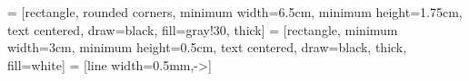 \pagestyle{fancy}
\fancyhf{}
\fancyhead[LE,RO]{\scshape\thepage}
\fancyhead[RE,LO]{
\scshape\ifnum\value{chapter}>0 \fi\leftmark}
\renewcommand{\headrulewidth}{.5pt}
\setlength{\headheight}{15pt}



\hypersetup{pdfdisplaydoctitle = true, colorlinks = false}
\captionsetup{width=.75\textwidth}

\graphicspath{ {./Graphics/} }


\setlength\parindent{0pt}
\allowdisplaybreaks



\setmainfont{MinionPro}

\def\thickhrulefill{\leavevmode \leaders \hrule height 1ex \hfill \kern \z@}
\def\@makechapterhead#1{%
  {\parindent \z@ \centering \reset@font
        \thickhrulefill\quad
        \scshape {\Large{\@chapapp{} \thechapter}}
        \quad \thickhrulefill
        \par\nobreak
        \vspace*{10\p@}%
        \interlinepenalty\@M
        \hrule
        \vspace*{10\p@}%
        \Huge \bfseries\scshape #1\par\nobreak
        \par
        \vspace*{10\p@}%
        \hrule
    \vskip 50\p@
  }}
  
\def\@makeschapterhead#1{%
  {\parindent \z@ \centering \reset@font
		\thickhrulefill\quad
        \scshape {\Large Preamble}
        \quad \thickhrulefill
        \par\nobreak
        \vspace*{10\p@}%
        \interlinepenalty\@M        
        \hrule
        \vspace*{10\p@}%
        \Huge \bfseries\scshape #1\par\nobreak
        \par
        \vspace*{10\p@}%
        \hrule
    \vskip 50\p@
  }}
  
 = [rectangle, rounded corners, minimum width=6.5cm, minimum height=1.75cm, text centered, draw=black, fill=gray!30, thick]
 = [rectangle, minimum width=3cm, minimum height=0.5cm, text centered, draw=black, thick, fill=white]
 = [line width=0.5mm,->]

